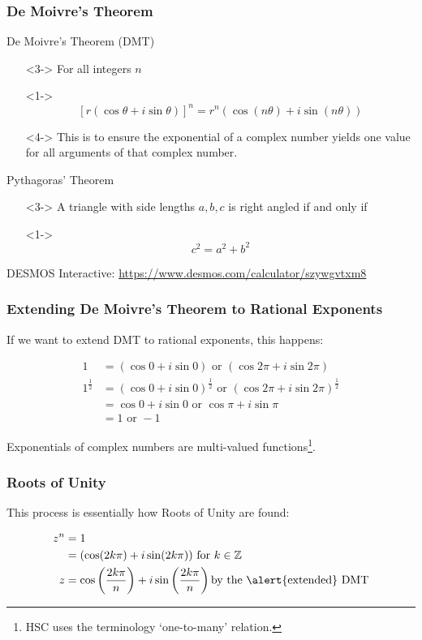 \documentclass{beamer}
\begin{document}
\begin{frame}
\frametitle{De Moivre's Theorem}
\begin{block}{De Moivre's Theorem (DMT)\\\parencite{syllabus}}
  \begin{itemize}
    \item[]<3-> For all \alert{integers $n$}
    \item[]<1-> \[[r(\cos\theta + i \sin\theta)]^n = r^n(\cos(n\theta) + i\sin(n\theta))\]
    \item[]<4-> This is to ensure the exponential of a complex number yields one value for all arguments of that complex number.
  \end{itemize}
  \end{block}
  \pause
  \begin{block}{Pythagoras' Theorem}
  \begin{itemize}
    \item[]<3-> A triangle with side lengths $a,b,c$ is right angled if and only if
    \item[]<1-> \[c^2 = a^2 + b^2\]
  \end{itemize}
\end{block}
\pause
DESMOS Interactive: \url{https://www.desmos.com/calculator/szywgvtxm8}
\end{frame}

\begin{frame}
\frametitle{Extending De Moivre's Theorem to Rational Exponents}
If we want to extend DMT to rational exponents, this happens:
\begin{example}
  \begin{align*}
    1 & = (\cos 0 + i \sin 0) \mbox{ or } (\cos 2\pi + i\sin 2 \pi)\\
    1^\frac{1}{2} & = (\cos 0 + i \sin 0)^\frac{1}{2} \mbox{ or }(\cos 2\pi + i\sin 2 \pi)^\frac{1}{2}\\
                  & = \cos 0 + i \sin 0 \mbox{ or } \cos \pi + i \sin \pi\\
                  & = 1 \mbox{ or } -1
  \end{align*}
\end{example}
\pause
Exponentials of complex numbers are \alert{multi-valued} functions\footnote<2->{HSC uses the terminology `one-to-many' relation.}.
\end{frame}

\begin{frame}
  \frametitle{Roots of Unity}
  This process is essentially how Roots of Unity are found:
  \begin{example}
    \begin{align*}
      z^n & = 1\\
          & = (\cos (2k\pi) + i\sin (2k\pi)) \mbox{ for } k \in \mathbb{Z}\\
      z & = \cos\left(\frac{2k\pi}{n}\right) + i\sin \left(\frac{2k\pi}{n}\right) \mbox{by the \alert{extended} DMT}
    \end{align*}
  \end{example}
\end{frame}
\end{document}
